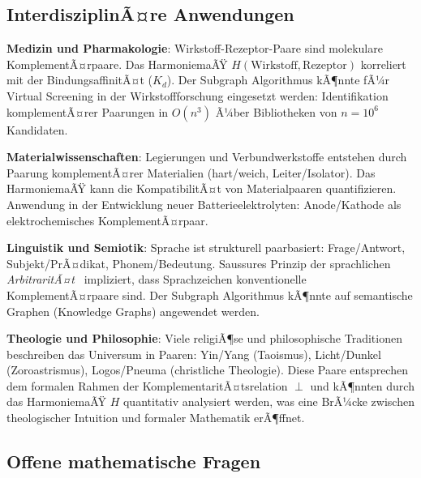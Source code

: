 ﻿\documentclass[a4paper,12pt]{article}
\theoremstyle{definition}
\begin{document}
\subsection{InterdisziplinÃ¤re Anwendungen}

\textbf{Medizin und Pharmakologie}: Wirkstoff-Rezeptor-Paare sind molekulare
KomplementÃ¤rpaare. Das HarmoniemaÃŸ $H(\text{Wirkstoff}, \text{Rezeptor})$
korreliert mit der BindungsaffinitÃ¤t ($K_d$). Der Subgraph Algorithmus kÃ¶nnte
fÃ¼r Virtual Screening in der Wirkstoffforschung eingesetzt werden: Identifikation
komplementÃ¤rer Paarungen in $O(n^3)$ Ã¼ber Bibliotheken von $n = 10^6$ Kandidaten.

\textbf{Materialwissenschaften}: Legierungen und Verbundwerkstoffe entstehen
durch Paarung komplementÃ¤rer Materialien (hart/weich, Leiter/Isolator).
Das HarmoniemaÃŸ kann die KompatibilitÃ¤t von Materialpaaren quantifizieren.
Anwendung in der Entwicklung neuer Batterieelektrolyten: Anode/Kathode als
elektrochemisches KomplementÃ¤rpaar.

\textbf{Linguistik und Semiotik}: Sprache ist strukturell paarbasiert:
Frage/Antwort, Subjekt/PrÃ¤dikat, Phonem/Bedeutung. Saussures Prinzip der
sprachlichen \emph{ArbitraritÃ¤t}~\cite{weyl1952} impliziert, dass Sprachzeichen
konventionelle KomplementÃ¤rpaare sind. Der Subgraph Algorithmus kÃ¶nnte auf
semantische Graphen (Knowledge Graphs) angewendet werden.

\textbf{Theologie und Philosophie}: Viele religiÃ¶se und philosophische Traditionen
beschreiben das Universum in Paaren: Yin/Yang (Taoismus), Licht/Dunkel (Zoroastrismus),
Logos/Pneuma (christliche Theologie). Diese Paare entsprechen dem formalen Rahmen
der KomplementaritÃ¤tsrelation $\perp$ und kÃ¶nnten durch das HarmoniemaÃŸ $H$
quantitativ analysiert werden, was eine BrÃ¼cke zwischen theologischer Intuition
und formaler Mathematik erÃ¶ffnet.

\subsection{Offene mathematische Fragen}
\end{document}
